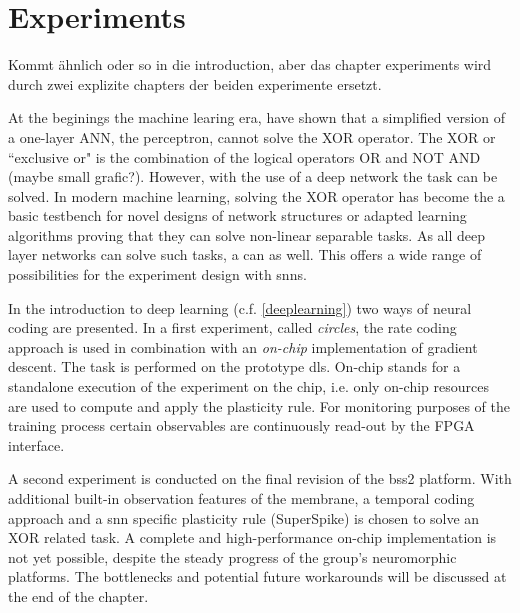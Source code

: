 \chapter{Experiments}
Kommt ähnlich oder so in die introduction, aber das chapter experiments wird durch zwei explizite chapters der beiden experimente ersetzt.


At the beginings the machine learing era, \cite{perceptron} have shown that a simplified version of a one-layer ANN, the perceptron, cannot solve the XOR operator. The XOR or ``exclusive or" is the combination of the logical operators OR and NOT AND (maybe small grafic?). However, with the use of a deep network the task can be solved. In modern machine learning, solving the XOR operator has become the a basic testbench for novel designs of network structures or adapted learning algorithms proving that they can solve non-linear separable tasks. As all deep layer networks can solve such tasks, a  can as well. This offers a wide range of possibilities for the experiment design with \glspl{snn}.

In the introduction to deep learning (c.f. \ref{deeplearning}) two ways of neural coding are presented. In a first experiment, called \textit{circles}, the rate coding approach is used in combination with an \textit{on-chip} implementation of gradient descent. The task is performed on the prototype \gls{dls}. On-chip stands for a standalone execution of the experiment on the chip, i.e. only on-chip resources are used to compute and apply the plasticity rule. For monitoring purposes of the training process certain observables are continuously read-out by the FPGA interface.

A second experiment is conducted on the final revision of the \gls{bss2} platform. With additional built-in observation features of the membrane, a temporal coding approach and a \gls{snn} specific plasticity rule (SuperSpike) is chosen to solve an XOR related task. A complete and high-performance on-chip implementation is not yet possible, despite the steady progress of the group's neuromorphic platforms. The bottlenecks and potential future workarounds will be discussed at the end of the chapter.\\


\newpage
